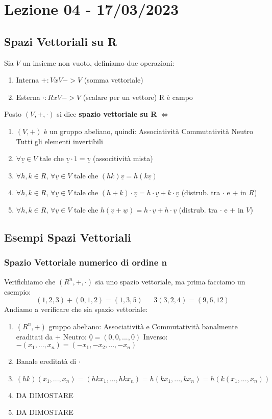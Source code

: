 \section{Lezione 04 - 17/03/2023}

\subsection{Spazi Vettoriali su R}
Sia $V$ un insieme non vuoto, definiamo due operazioni:
\begin{enumerate}
\item [] Interna $ +: VxV -> V $ (somma vettoriale) 
\item [] Esterna $ \cdot: RxV -> V $ (scalare per un vettore)  R è campo
\end{enumerate}
Posto $(V,+,\cdot)$ si dice \textbf{spazio vettoriale su R} $\Leftrightarrow$

\begin{enumerate}
\item $ (V,+) $ è un gruppo abeliano, quindi:
	\subitem Associatività
	\subitem Commutatività
	\subitem Neutro
	\subitem Tutti gli elementi invertibili
\item $ \forall \underline{v} \in V $ tale che $ \underline{v} \cdot 1 = \underline{v}$ (associtività mista)
\item $ \forall h,k \in R$, $\forall \underline{v} \in V$ tale che $ (hk)\underline{v} = h(k\underline{v})$
\item $ \forall h,k \in R$, $\forall \underline{v} \in V$ tale che $ (h+k)\cdot\underline{v} = h\cdot\underline{v} + k\cdot\underline{v}$ (distrub. tra $\cdot$ e $+$ in $R$)
\item $ \forall h,k \in R$, $\forall \underline{v} \in V$ tale che $ h(\underline{v}+\underline{w}) = h\cdot\underline{v} + h\cdot\underline{v}$  (distrub. tra $\cdot$ e $+$ in $V$)
\end{enumerate}

\subsection{Esempi Spazi Vettoriali}

\subsubsection{Spazio Vettoriale numerico di ordine n}
Verifichiamo che $(R^n,+,\cdot)$ sia uno spazio vettoriale, ma prima facciamo un esempio:
$$ (1,2,3) + (0,1,2) = (1,3,5) \:\:\:\:\:\:\: 3(3,2,4)=(9,6,12)$$
Andiamo a verificare che sia spazio vettoriale:
\begin{enumerate}
\item $ (R^n, +) $ gruppo abeliano:
	\subitem * Associatività e Commutatività banalmente eraditati da $+$
	\subitem * Neutro: $\underline{0} = (0,0,...,0)$
	\subitem * Inverso: $-(x_1,...,x_n) = (-x_1,-x_2,...,-x_n)$
\item Banale ereditatà di $\cdot$
\item $ (hk)(x_1,...,x_n) = (hkx_1,...,hkx_n) = h(kx_1,...,kx_n) = h(k(x_1,...,x_n))$
\item DA DIMOSTARE
\item DA DIMOSTARE
\end{enumerate}

